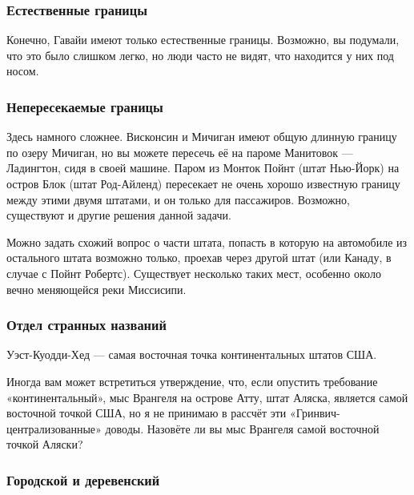 \subsubsection*{Естественные границы}%

Конечно, Гавайи имеют только естественные границы.
Возможно, вы подумали, что это было слишком легко, но люди часто не видят, что находится у них под носом.
\heart

\subsubsection*{Непересекаемые границы}%

Здесь намного сложнее.
Висконсин и Мичиган имеют общую длинную границу по озеру Мичиган, но вы можете пересечь её на пароме Манитовок --- Ладингтон, сидя в своей машине.
Паром из Монток Пойнт %
(штат Нью-Йорк) на остров Блок %
(штат Род-Айленд) пересекает не очень хорошо известную границу между этими двумя штатами, и он только для пассажиров.
Возможно, существуют и другие решения данной задачи.\heart
                             

Можно задать схожий вопрос о части штата, попасть в которую на автомобиле из остального штата возможно только, проехав через другой штат (или Канаду, в случае с 
Пойнт Робертс). %
Существует несколько таких мест, особенно около вечно меняющейся реки Миссисипи.

\subsubsection*{Отдел странных названий}%

Уэст-Куодди-Хед %
--- самая восточная точка континентальных штатов США.\heart
                            

Иногда вам может встретиться утверждение, что, если опустить требование «континентальный», мыс Врангеля %
на острове Атту, %
штат Аляска, является самой восточной точкой США, но я не принимаю в рассчёт эти «Гринвич-централизованные» доводы.
Назовёте ли вы мыс Врангеля самой восточной точкой Аляски?

\subsubsection*{Городской и деревенский}%

